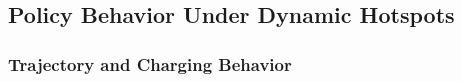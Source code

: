\documentclass[journal]{IEEEtran}
\begin{document}



\subsection{Policy Behavior Under Dynamic Hotspots}




\subsubsection{Trajectory and Charging Behavior}
\end{document}
